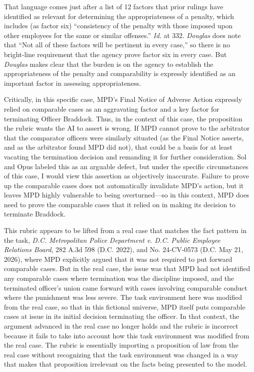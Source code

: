 \documentclass[11pt]{article}
\begin{document}
That language comes just after a list of 12 factors that prior rulings have identified as relevant for determining the appropriateness of a penalty, which includes (as factor six) ``consistency of the penalty with those imposed upon other employees for the same or similar offenses.'' \emph{Id.} at 332. \emph{Douglas} does note that ``Not all of these factors will be pertinent in every case,'' so there is no bright-line requirement that the agency prove factor six in every case. But \emph{Douglas} makes clear that the burden is on the agency to establish the appropriateness of the penalty and comparability is expressly identified as an important factor in assessing appropriateness.

Critically, in this specific case, MPD's Final Notice of Adverse Action expressly relied on comparable cases as an aggravating factor and a key factor for terminating Officer Braddock. Thus, in the context of this case, the proposition the rubric wants the AI to assert is wrong. If MPD cannot prove to the arbitrator that the comparator officers were similarly situated (as the Final Notice asserts, and as the arbitrator found MPD did not), that could be a basis for at least vacating the termination decision and remanding it for further consideration. Sol and Opus labeled this as an arguable defect, but under the specific circumstances of this case, I would view this assertion as objectively inaccurate. Failure to prove up the comparable cases does not automatically invalidate MPD's action, but it leaves MPD highly vulnerable to being overturned---so in this context, MPD does need to prove the comparable cases that it relied on in making its decision to terminate Braddock.

This rubric appears to be lifted from a real case that matches the fact pattern in the task, \emph{D.C. Metropolitan Police Department v. D.C. Public Employee Relations Board}, 282 A.3d 598 (D.C. 2022), and No. 24-CV-0573 (D.C. May 21, 2026), where MPD explicitly argued that it was not required to put forward comparable cases. But in the real case, the issue was that MPD had not identified any comparable cases where termination was the discipline imposed, and the terminated officer's union came forward with cases involving comparable conduct where the punishment was less severe. The task environment here was modified from the real case, so that in this fictional universe, MPD itself puts comparable cases at issue in its initial decision terminating the officer. In that context, the argument advanced in the real case no longer holds and the rubric is incorrect because it fails to take into account how this task environment was modified from the real case. The rubric is essentially importing a proposition of law from the real case without recognizing that the task environment was changed in a way that makes that proposition irrelevant on the facts being presented to the model.
\end{document}
